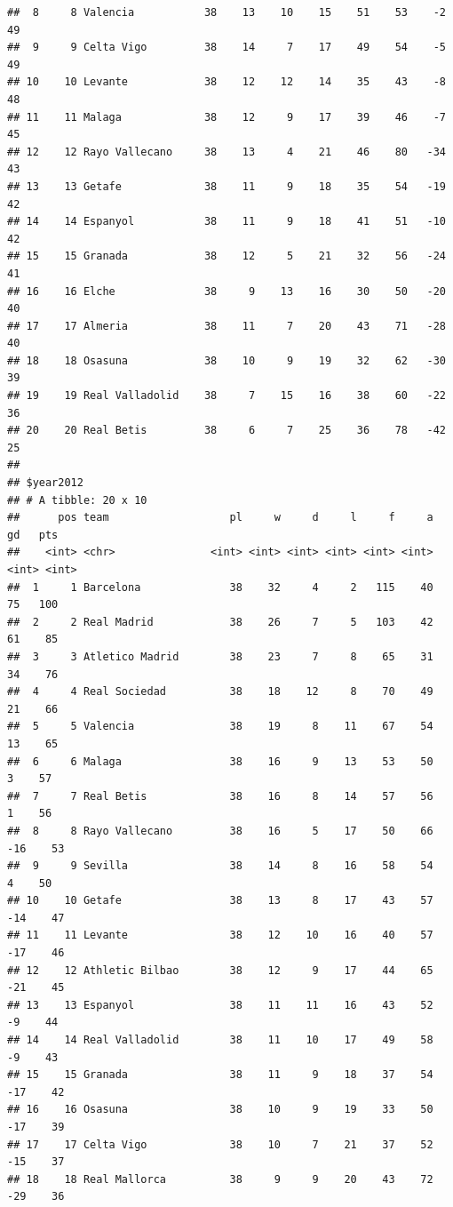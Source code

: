 \documentclass[]{tufte-handout}
\begin{document}
\begin{verbatim}
##  8     8 Valencia           38    13    10    15    51    53    -2    49
##  9     9 Celta Vigo         38    14     7    17    49    54    -5    49
## 10    10 Levante            38    12    12    14    35    43    -8    48
## 11    11 Malaga             38    12     9    17    39    46    -7    45
## 12    12 Rayo Vallecano     38    13     4    21    46    80   -34    43
## 13    13 Getafe             38    11     9    18    35    54   -19    42
## 14    14 Espanyol           38    11     9    18    41    51   -10    42
## 15    15 Granada            38    12     5    21    32    56   -24    41
## 16    16 Elche              38     9    13    16    30    50   -20    40
## 17    17 Almeria            38    11     7    20    43    71   -28    40
## 18    18 Osasuna            38    10     9    19    32    62   -30    39
## 19    19 Real Valladolid    38     7    15    16    38    60   -22    36
## 20    20 Real Betis         38     6     7    25    36    78   -42    25
## 
## $year2012
## # A tibble: 20 x 10
##      pos team                   pl     w     d     l     f     a    gd   pts
##    <int> <chr>               <int> <int> <int> <int> <int> <int> <int> <int>
##  1     1 Barcelona              38    32     4     2   115    40    75   100
##  2     2 Real Madrid            38    26     7     5   103    42    61    85
##  3     3 Atletico Madrid        38    23     7     8    65    31    34    76
##  4     4 Real Sociedad          38    18    12     8    70    49    21    66
##  5     5 Valencia               38    19     8    11    67    54    13    65
##  6     6 Malaga                 38    16     9    13    53    50     3    57
##  7     7 Real Betis             38    16     8    14    57    56     1    56
##  8     8 Rayo Vallecano         38    16     5    17    50    66   -16    53
##  9     9 Sevilla                38    14     8    16    58    54     4    50
## 10    10 Getafe                 38    13     8    17    43    57   -14    47
## 11    11 Levante                38    12    10    16    40    57   -17    46
## 12    12 Athletic Bilbao        38    12     9    17    44    65   -21    45
## 13    13 Espanyol               38    11    11    16    43    52    -9    44
## 14    14 Real Valladolid        38    11    10    17    49    58    -9    43
## 15    15 Granada                38    11     9    18    37    54   -17    42
## 16    16 Osasuna                38    10     9    19    33    50   -17    39
## 17    17 Celta Vigo             38    10     7    21    37    52   -15    37
## 18    18 Real Mallorca          38     9     9    20    43    72   -29    36

\end{verbatim}
\end{document}
